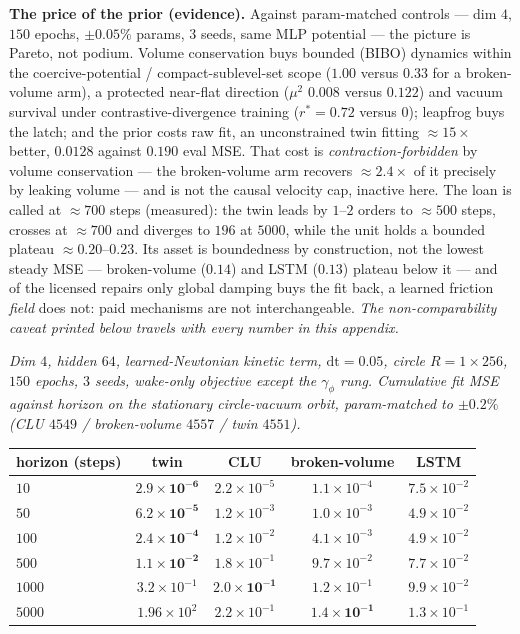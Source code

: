 \documentclass{article}
\begin{document}
\textbf{The price of the prior (evidence).} Against param-matched controls --- dim $4$, $150$ epochs, $\pm0.05\%$ params, $3$ seeds, same MLP potential --- the picture is Pareto, not podium. Volume conservation buys bounded (BIBO) dynamics within the coercive-potential / compact-sublevel-set scope ($1.00$ versus $0.33$ for a broken-volume arm), a protected near-flat direction ($\mu^2$ $0.008$ versus $0.122$) and vacuum survival under contrastive-divergence training ($r^*=0.72$ versus $0$); leapfrog buys the latch; and the prior costs raw fit, an unconstrained twin fitting $\approx15\times$ better, $0.0128$ against $0.190$ eval MSE. That cost is \emph{contraction-forbidden} by volume conservation --- the broken-volume arm recovers $\approx2.4\times$ of it precisely by leaking volume --- and is not the causal velocity cap, inactive here. The loan is called at $\approx700$ steps (measured): the twin leads by $1$--$2$ orders to $\approx500$ steps, crosses at $\approx700$ and diverges to $196$ at $5000$, while the unit holds a bounded plateau $\approx0.20$--$0.23$. Its asset is boundedness by construction, not the lowest steady MSE --- broken-volume ($0.14$) and LSTM ($0.13$) plateau below it --- and of the licensed repairs only global damping buys the fit back, a learned friction \emph{field} does not: paid mechanisms are not interchangeable. \emph{The non-comparability caveat printed below travels with every number in this appendix.}

\emph{Dim $4$, hidden $64$, learned-Newtonian kinetic term, $\mathrm{dt}=0.05$, circle $R{=}1{\times}256$, $150$ epochs, $3$ seeds, wake-only objective except the $\gamma_\phi$ rung. Cumulative fit MSE against horizon on the stationary circle-vacuum orbit, param-matched to $\pm0.2\%$ (CLU $4549$ / broken-volume $4557$ / twin $4551$).}

\begin{center}
\begin{tabular}{lcccc}
\toprule
horizon (steps) & \textbf{twin} & \textbf{CLU} & broken-volume & LSTM \\
\midrule
$10$ & $\mathbf{2.9{\times}10^{-6}}$ & $2.2{\times}10^{-5}$ & $1.1{\times}10^{-4}$ & $7.5{\times}10^{-2}$ \\
$50$ & $\mathbf{6.2{\times}10^{-5}}$ & $1.2{\times}10^{-3}$ & $1.0{\times}10^{-3}$ & $4.9{\times}10^{-2}$ \\
$100$ & $\mathbf{2.4{\times}10^{-4}}$ & $1.2{\times}10^{-2}$ & $4.1{\times}10^{-3}$ & $4.9{\times}10^{-2}$ \\
$500$ & $\mathbf{1.1{\times}10^{-2}}$ & $1.8{\times}10^{-1}$ & $9.7{\times}10^{-2}$ & $7.7{\times}10^{-2}$ \\
$1000$ & $3.2{\times}10^{-1}$ & $\mathbf{2.0{\times}10^{-1}}$ & $1.2{\times}10^{-1}$ & $9.9{\times}10^{-2}$ \\
$5000$ & $1.96{\times}10^{2}$ & $2.2{\times}10^{-1}$ & $\mathbf{1.4{\times}10^{-1}}$ & $1.3{\times}10^{-1}$ \\
\bottomrule
\end{tabular}
\end{center}
\end{document}
